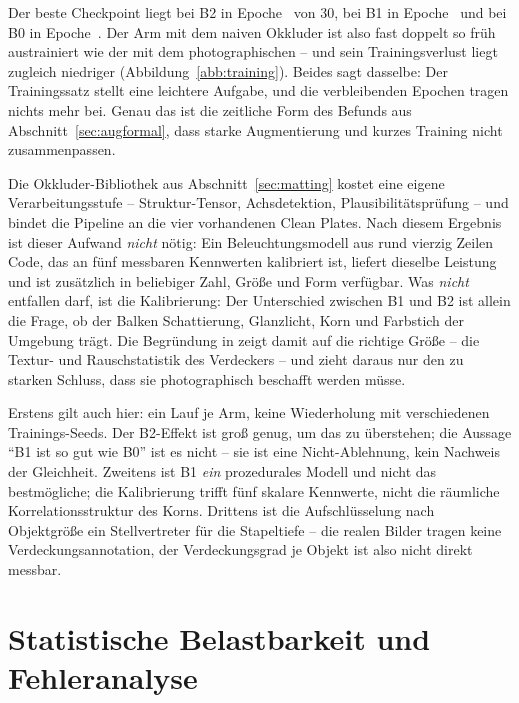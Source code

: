  Der beste Checkpoint liegt bei B2
in Epoche~\zBTwoEpoche{} von 30, bei B1 in Epoche~\zBOneEpoche{} und bei B0 in
Epoche~\zBZeroEpoche. Der Arm mit dem naiven Okkluder ist also fast doppelt so
früh austrainiert wie der mit dem photographischen -- und sein Trainingsverlust
liegt zugleich niedriger (Abbildung~\ref{abb:training}). Beides sagt dasselbe:
Der Trainingssatz stellt eine leichtere Aufgabe, und die verbleibenden Epochen
tragen nichts mehr bei. Genau das ist die zeitliche Form des Befunds aus
Abschnitt~\ref{sec:augformal}, dass starke Augmentierung und kurzes Training
nicht zusammenpassen.

 Die Okkluder-Bibliothek aus
Abschnitt~\ref{sec:matting} kostet eine eigene Verarbeitungsstufe --
Struktur-Tensor, Achsdetektion, Plausibilitätsprüfung -- und bindet die Pipeline
an die vier vorhandenen Clean Plates. Nach diesem Ergebnis ist dieser Aufwand
\emph{nicht} nötig: Ein Beleuchtungsmodell aus rund vierzig Zeilen Code, das an
fünf messbaren Kennwerten kalibriert ist, liefert dieselbe Leistung und ist
zusätzlich in beliebiger Zahl, Größe und Form verfügbar. Was \emph{nicht}
entfallen darf, ist die Kalibrierung: Der Unterschied zwischen B1 und B2 ist
allein die Frage, ob der Balken Schattierung, Glanzlicht, Korn und Farbstich der
Umgebung trägt. Die Begründung in  zeigt damit auf die
richtige Größe -- die Textur- und Rauschstatistik des Verdeckers -- und zieht
daraus nur den zu starken Schluss, dass sie photographisch beschafft werden
müsse.

 Erstens gilt auch hier: ein Lauf je Arm, keine
Wiederholung mit verschiedenen Trainings-Seeds. Der B2-Effekt ist groß genug, um
das zu überstehen; die Aussage \enquote{B1 ist so gut wie B0} ist es nicht --
sie ist eine Nicht-Ablehnung, kein Nachweis der Gleichheit. Zweitens ist B1
\emph{ein} prozedurales Modell und nicht das bestmögliche; die Kalibrierung
trifft fünf skalare Kennwerte, nicht die räumliche Korrelationsstruktur des
Korns. Drittens ist die Aufschlüsselung nach Objektgröße ein Stellvertreter für
die Stapeltiefe -- die realen Bilder tragen keine Verdeckungsannotation, der
Verdeckungsgrad je Objekt ist also nicht direkt messbar.

\section{Statistische Belastbarkeit und Fehleranalyse}
\label{sec:bootstrap}

